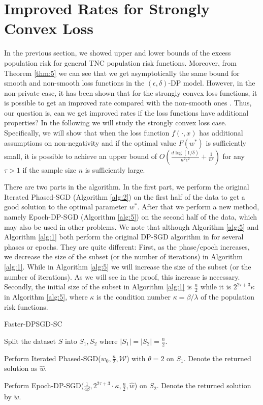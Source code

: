 \documentclass[12pt]{alt2022} %
\renewcommand{\tilde}{\widetilde}
\begin{document}
\section{Improved Rates for Strongly Convex Loss}
In the previous section, we showed upper and lower bounds  of the excess population risk for general TNC population risk functions. Moreover, from Theorem \ref{thm:5} we can see that we get asymptotically the same bound for smooth and non-smooth loss functions in the $(\epsilon, \delta)$-DP model. However, in the non-private case, it has been shown that for the strongly convex loss functions, it is possible to get an improved rate compared with the non-smooth ones \citep{zhang2019stochastic}. Thus, our question is, can we get improved rates if the loss functions have additional properties? In the following we will  study the strongly convex loss case. Specifically, we will show that when the loss function $f(\cdot, x)$ has additional assumptions on non-negativity and if the optimal value $F(w^*)$ is sufficiently small, it is possible to achieve an upper bound of $O(\frac{d\log(1/\delta)}{n^2\epsilon^2}+\frac{1}{n^{\tau}})$ for any $\tau>1$ if the sample size $n$ is sufficiently large.  


There are two parts in the algorithm. In the first part, we perform the original Iterated Phased-SGD (Algorithm \ref{alg:2}) on the first half of the data to get a good solution to the optimal parameter $w^*$. After that we perform a new method, namely Epoch-DP-SGD (Algorithm \ref{alg:5}) on the second half of the data, which may also be used in other problems. We note that although Algorithm \ref{alg:5} and Algorithm \ref{alg:1} both perform the original DP-SGD algorithm  in \citep{bassily2014private} for several phases or epochs. They are quite different: First, as the phase/epoch increases, we decrease the size of the subset (or the number of iterations) in Algorithm \ref{alg:1}. While in Algorithm \ref{alg:5} we will increase the size of the subset (or the number of iterations). As we will see in the proof, this increase is necessary.  Secondly, the initial size of the subset in Algorithm \ref{alg:1} is $\frac{n}{2}$ while it is $2^{2\tau+3}\kappa$ in Algorithm \ref{alg:5}, where $\kappa$ is the condition number $\kappa=\beta/\lambda$ of the population risk functions. 


		\begin{algorithm}
	\caption{Faster-DPSGD-SC\label{alg:6}}
		
	    Split the dataset $S$ into $S_1, S_2$ where $|S_1|=|S_2|=\frac{n}{2}$. \;
	    
Perform Iterated Phased-SGD($w_0,\frac{n}{2},\mathcal{W}$) with $\theta=2$ on $S_1$. Denote the returned solution as $\hat{w}$.\;

Perform Epoch-DP-SGD($\frac{1}{4\beta},2^{2\tau+3}\cdot \kappa,\frac{n}{2},\hat{w}$) on $S_2$. Denote the returned solution by $\tilde{w}$.\;

	\Return {$\tilde{w}$}
\end{algorithm}
\end{document}

